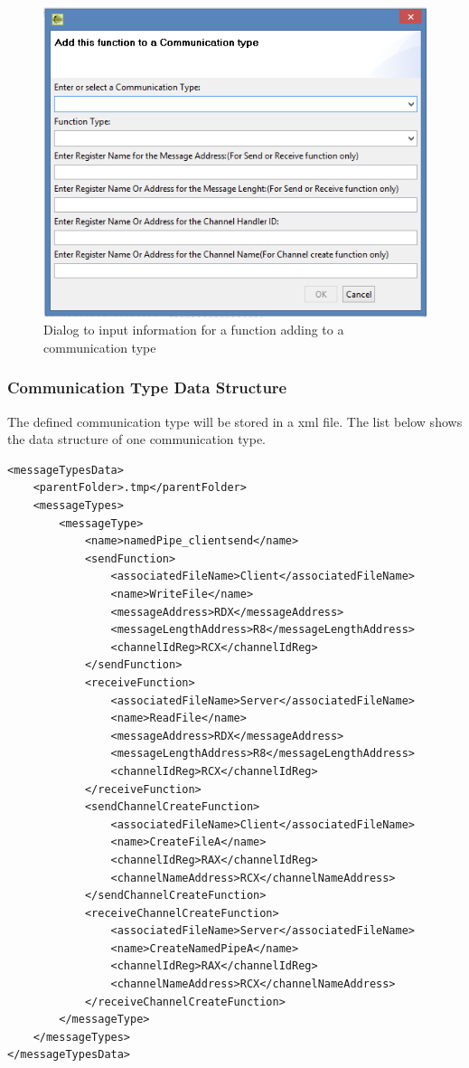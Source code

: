 \documentclass[paper=a4, fontsize=11pt]{scrartcl}
\numberwithin{equation}{section}		%
\numberwithin{figure}{section}			%
\numberwithin{table}{section}				%
\begin{document}
\begin{figure}[h]
\includegraphics{dialog}
 \caption{Dialog to input information for a function adding to a communication type}
\label{dialog}
\end{figure}

\subsubsection{Communication Type Data Structure}
The defined communication type will be stored in a xml file. The list below shows the data structure of one communication type. 
\begin{lstlisting}
<messageTypesData>
    <parentFolder>.tmp</parentFolder>
    <messageTypes>
        <messageType>
            <name>namedPipe_clientsend</name>
            <sendFunction>
                <associatedFileName>Client</associatedFileName>
                <name>WriteFile</name>
                <messageAddress>RDX</messageAddress>
                <messageLengthAddress>R8</messageLengthAddress>
                <channelIdReg>RCX</channelIdReg>
            </sendFunction>
            <receiveFunction>
                <associatedFileName>Server</associatedFileName>
                <name>ReadFile</name>
                <messageAddress>RDX</messageAddress>
                <messageLengthAddress>R8</messageLengthAddress>
                <channelIdReg>RCX</channelIdReg>
            </receiveFunction>
            <sendChannelCreateFunction>
                <associatedFileName>Client</associatedFileName>
                <name>CreateFileA</name>
                <channelIdReg>RAX</channelIdReg>
                <channelNameAddress>RCX</channelNameAddress>
            </sendChannelCreateFunction>
            <receiveChannelCreateFunction>
                <associatedFileName>Server</associatedFileName>
                <name>CreateNamedPipeA</name>
                <channelIdReg>RAX</channelIdReg>
                <channelNameAddress>RCX</channelNameAddress>
            </receiveChannelCreateFunction>
        </messageType>
    </messageTypes>
</messageTypesData>
\end{lstlisting}
\end{document}
